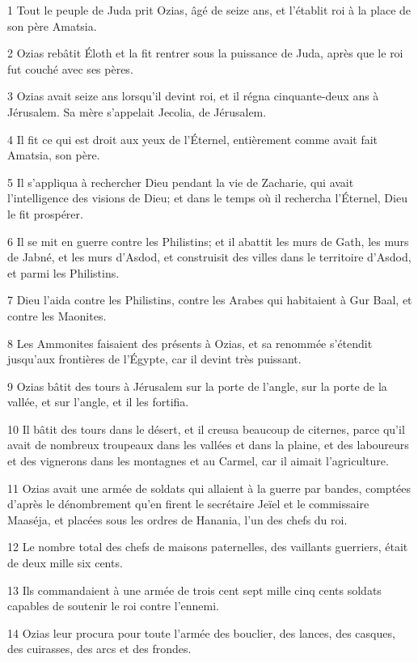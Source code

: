 \par 1 Tout le peuple de Juda prit Ozias, âgé de seize ans, et l'établit roi à la place de son père Amatsia.
\par 2 Ozias rebâtit Éloth et la fit rentrer sous la puissance de Juda, après que le roi fut couché avec ses pères.
\par 3 Ozias avait seize ans lorsqu'il devint roi, et il régna cinquante-deux ans à Jérusalem. Sa mère s'appelait Jecolia, de Jérusalem.
\par 4 Il fit ce qui est droit aux yeux de l'Éternel, entièrement comme avait fait Amatsia, son père.
\par 5 Il s'appliqua à rechercher Dieu pendant la vie de Zacharie, qui avait l'intelligence des visions de Dieu; et dans le temps où il rechercha l'Éternel, Dieu le fit prospérer.
\par 6 Il se mit en guerre contre les Philistins; et il abattit les murs de Gath, les murs de Jabné, et les murs d'Asdod, et construisit des villes dans le territoire d'Asdod, et parmi les Philistins.
\par 7 Dieu l'aida contre les Philistins, contre les Arabes qui habitaient à Gur Baal, et contre les Maonites.
\par 8 Les Ammonites faisaient des présents à Ozias, et sa renommée s'étendit jusqu'aux frontières de l'Égypte, car il devint très puissant.
\par 9 Ozias bâtit des tours à Jérusalem sur la porte de l'angle, sur la porte de la vallée, et sur l'angle, et il les fortifia.
\par 10 Il bâtit des tours dans le désert, et il creusa beaucoup de citernes, parce qu'il avait de nombreux troupeaux dans les vallées et dans la plaine, et des laboureurs et des vignerons dans les montagnes et au Carmel, car il aimait l'agriculture.
\par 11 Ozias avait une armée de soldats qui allaient à la guerre par bandes, comptées d'après le dénombrement qu'en firent le secrétaire Jeïel et le commissaire Maaséja, et placées sous les ordres de Hanania, l'un des chefs du roi.
\par 12 Le nombre total des chefs de maisons paternelles, des vaillants guerriers, était de deux mille six cents.
\par 13 Ils commandaient à une armée de trois cent sept mille cinq cents soldats capables de soutenir le roi contre l'ennemi.
\par 14 Ozias leur procura pour toute l'armée des bouclier, des lances, des casques, des cuirasses, des arcs et des frondes.
